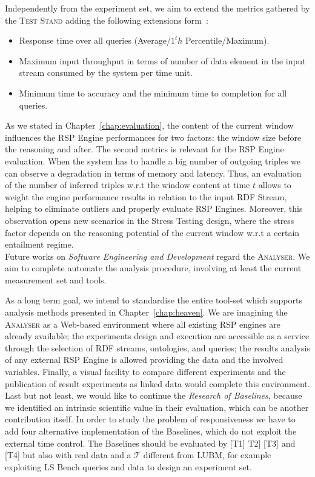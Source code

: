 Independently from the experiment set, we aim to extend the metrics gathered by the \textsc{Test Stand} adding the following extensions form~\cite{DBLP:conf/esws/ScharrenbachUMVB13}:
\begin{itemize}
\item Response time over all queries (Average/$1^th$ Percentile/Maximum).
\item Maximum input throughput in terms of number of data element in the input stream consumed by the system per time unit.
\item Minimum time to accuracy and the minimum time to completion for all queries.
\end{itemize}

As we stated in Chapter~\ref{chap:evaluation}, the content of the current window influences the RSP Engine performances for two factors: the window size before the reasoning and after. The second metrics is relevant for the RSP Engine evaluation. When the system has to handle a big number of outgoing triples we can observe a degradation in terms of memory and latency. Thus, an evaluation of the number of inferred triples w.r.t the window content at time $t$ allows to weight the engine performance results in relation to the input RDF Stream, helping to eliminate outliers and properly evaluate RSP Engines. Moreover, this observation opens new scenarios in the Stress Testing design, where the stress factor depends on the reasoning potential of the current window w.r.t a certain entailment regime.\\

\noindent Future works on \textit{Software Engineering and Development} regard the \textsc{Analyser}.  We aim to complete automate the analysis procedure, involving at least the current measurement set and tools. 

As a long term goal, we intend to standardise the entire tool-set which supports analysis methods presented in Chapter~\ref{chap:heaven}. We are imagining the \textsc{Analyser} as a Web-based environment where all existing RSP engines are already available; the experiments design and execution are accessible as a service through the selection of RDF streams, ontologies, and queries; the results analysis of any external RSP Engine is allowed providing the data and the involved variables. Finally, a visual facility to compare different experiments and the publication of result experiments as linked data would complete this environment. \\


\noindent Last but not least, we would like to continue the \textit{Research of Baselines}, because we identified an intrinsic scientific value in their evaluation, which can be another contribution itself. In order to study the problem of responsiveness we have to add four alternative implementation of the Baselines, which do not exploit the external time control. The Baselines should be evaluated by [T1] T2] [T3] and [T4] but also with real data and a $\mathcal{T}$ different from LUBM, for example exploiting LS Bench queries and data to design an experiment set. 
